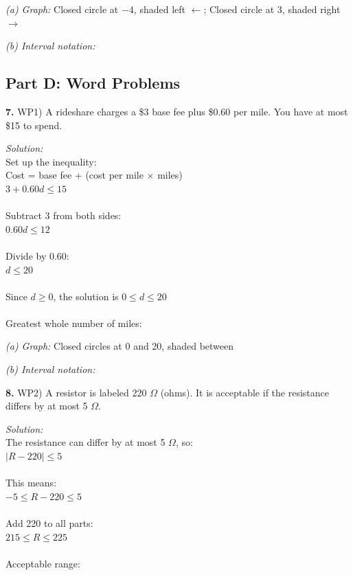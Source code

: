 \documentclass[12pt]{article}
\begin{document}
                \textit{(a) Graph:} Closed circle at $-4$, shaded left $\leftarrow$; Closed circle at 3, shaded right $\rightarrow$

                \textit{(b) Interval notation:} \fbox{$(-\infty, -4] \cup [3, \infty)$}

                \newpage

        \subsection*{Part D: Word Problems}

            \textbf{7.} WP1) A rideshare charges a \$3 base fee plus \$0.60 per mile. You have at most \$15 to spend.

                \textit{Solution:}\\
                Set up the inequality:\\
                Cost = base fee + (cost per mile $\times$ miles)\\
                $3 + 0.60d \leq 15$\\
                \\
                Subtract 3 from both sides:\\
                $0.60d \leq 12$\\
                \\
                Divide by 0.60:\\
                $d \leq 20$\\
                \\
                Since $d \geq 0$, the solution is $0 \leq d \leq 20$\\
                \\
                Greatest whole number of miles: 

                \textit{(a) Graph:} Closed circles at 0 and 20, shaded between

                \textit{(b) Interval notation:} \fbox{$[0, 20]$}

                \vspace{0.5cm}

            \textbf{8.} WP2) A resistor is labeled 220 $\Omega$ (ohms). It is acceptable if the resistance differs by at most 5 $\Omega$.

                \textit{Solution:}\\
                The resistance can differ by at most 5 $\Omega$, so:\\
                $|R - 220| \leq 5$\\
                \\
                This means:\\
                $-5 \leq R - 220 \leq 5$\\
                \\
                Add 220 to all parts:\\
                $215 \leq R \leq 225$\\
                \\
                Acceptable range: 
\end{document}
